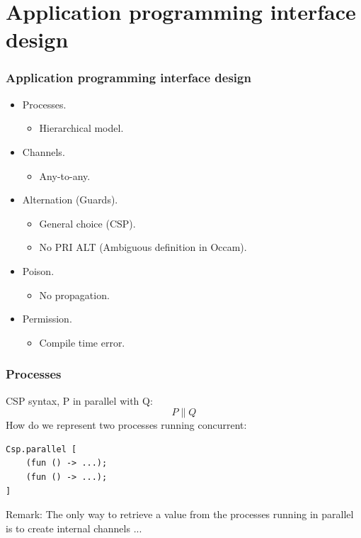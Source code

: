\documentclass{beamer}
\newcommand{\green}[1] {\textcolor{kugreen}{#1}}
\begin{document}
\section[API]{Application programming interface design}
\begin{frame}
  \frametitle{Application programming interface design}
  \begin{itemize}
    \item Processes.
      \begin{itemize}
        \item Hierarchical model.
      \end{itemize}
    \item Channels. 
      \begin{itemize}
        \item Any-to-any.
      \end{itemize}
    \item Alternation (Guards).
      \begin{itemize}
        \item General choice (CSP).
        \item No PRI ALT (Ambiguous definition in Occam).
      \end{itemize}
    \item Poison.
      \begin{itemize}
        \item No propagation.
      \end{itemize}
    \item Permission.
      \begin{itemize}
        \item Compile time error.
      \end{itemize}
  \end{itemize}
\end{frame}

\begin{frame}[fragile]
  \frametitle{Processes}
  CSP syntax, P in parallel with Q:
    \[P \parallel Q\]
  How do we represent two processes running concurrent:
\scriptsize
\begin{verbatim}
Csp.parallel [
    (fun () -> ...);
    (fun () -> ...);
]
\end{verbatim}
\normalsize
\green{Remark:} The only way to retrieve a value from the processes running in
parallel is to create internal channels ...
\end{frame}
\end{document}

